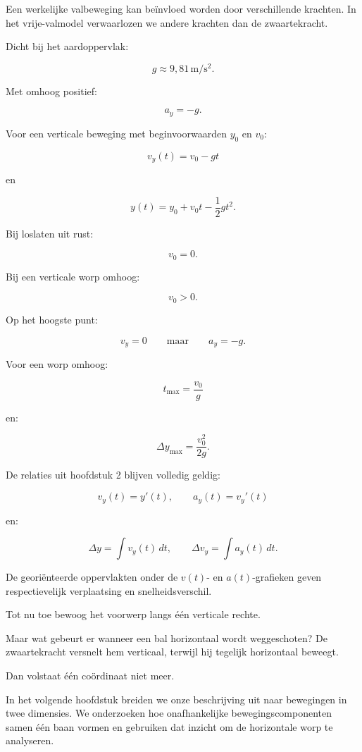 \documentclass{ximera}
\begin{document}


Een werkelijke valbeweging kan beïnvloed worden door verschillende
krachten. In het vrije-valmodel verwaarlozen we andere krachten dan
de zwaartekracht.

Dicht bij het aardoppervlak:

\[
g\approx9,81\,\mathrm{m/s^2}.
\]

Met omhoog positief:

\[
\boxed{a_y=-g.}
\]

Voor een verticale beweging met beginvoorwaarden $y_0$ en $v_0$:

\[
\boxed{
v_y(t)=v_0-gt
}
\]

en

\[
\boxed{
y(t)=y_0+v_0t-\frac12gt^2.
}
\]

Bij loslaten uit rust:

\[
v_0=0.
\]

Bij een verticale worp omhoog:

\[
v_0>0.
\]

Op het hoogste punt:

\[
\boxed{
v_y=0
\qquad\text{maar}\qquad
a_y=-g.
}
\]

Voor een worp omhoog:

\[
\boxed{
t_{\max}=\frac{v_0}{g}
}
\]

en:

\[
\boxed{
\Delta y_{\max}=\frac{v_0^2}{2g}.
}
\]

De relaties uit hoofdstuk 2 blijven volledig geldig:

\[
\boxed{
v_y(t)=y'(t),
\qquad
a_y(t)=v_y'(t)
}
\]

en:

\[
\boxed{
\Delta y=\int v_y(t)\,dt,
\qquad
\Delta v_y=\int a_y(t)\,dt.
}
\]

De georiënteerde oppervlakten onder de $v(t)$- en $a(t)$-grafieken
geven respectievelijk verplaatsing en snelheidsverschil.






Tot nu toe bewoog het voorwerp langs één verticale rechte.

Maar wat gebeurt er wanneer een bal horizontaal wordt weggeschoten?
De zwaartekracht versnelt hem verticaal, terwijl hij tegelijk
horizontaal beweegt.

Dan volstaat één coördinaat niet meer.

In het volgende hoofdstuk breiden we onze beschrijving uit naar
bewegingen in twee dimensies. We onderzoeken hoe onafhankelijke
bewegingscomponenten samen één baan vormen en gebruiken dat inzicht
om de horizontale worp te analyseren.
\end{document}
